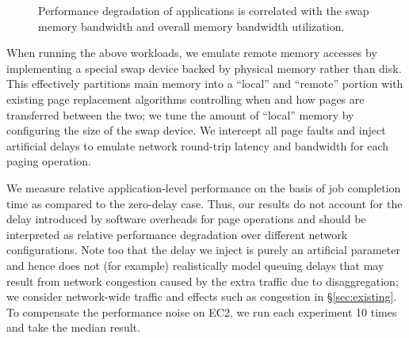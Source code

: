 %
%
\begin{figure}[t]
    \centering
    \caption{\small{Performance degradation of applications is correlated with the swap memory bandwidth and overall memory bandwidth utilization.}}
    \label{fig:bandwidths11}
\end{figure}
%

When running the above workloads, we emulate remote memory accesses by implementing a special swap device backed by physical memory rather than disk. 
This effectively partitions main memory into a ``local'' and ``remote'' portion with existing page replacement algorithms controlling when and how pages are transferred between the two; we tune the amount of ``local'' memory by configuring the size of the swap device.
We intercept all page faults and inject artificial delays to emulate network round-trip latency and bandwidth for each paging operation. 

We measure relative application-level performance on the basis of job completion time as compared to the zero-delay case. Thus, our results do not account for the delay introduced by  software overheads for page operations 
and should be interpreted as relative performance degradation over different network configurations. %
Note too that the delay we inject is purely an artificial parameter and hence does not (for example) realistically model queuing delays that may result from network congestion caused by the extra traffic due to disaggregation; we consider network-wide traffic and effects such as congestion in \S\ref{sec:existing}.
To compensate the performance noise on EC2, we run each experiment 10 times and take the median result.

